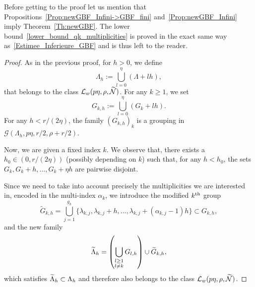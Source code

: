 \documentclass[AHL,Unicode,longabstracts]{cedram}
\newcommand{\n}{g}
\newcommand{\LL}{\mathcal{L}}
\newcommand{\NN}{\mathcal{N}}
\let\oldtilde\tilde
\renewcommand*{\tilde}[1]{\mathchoice{\widetilde{#1}}{\widetilde{#1}}{\oldtilde{#1}}{\oldtilde{#1}}}\let\oldexists\exists
\renewcommand*{\exists}{\mathrel{\oldexists}}
\begin{document}
Before getting to the proof let us mention that Propositions~\ref{Prop:newGBF_Infini->GBF_fini} and~\ref{Prop:newGBF_Infini} imply Theorem~\ref{Th:newGBF}. The lower bound~\eqref{lower_bound_qk_multiplicities} is proved in the exact same way as~\eqref{Estimee_Inferieure_GBF} and is thus left to the reader.
\begin{proof}
As in the previous proof, for $h>0$, we define
\[
\Lambda_h :=\bigcup_{l=0}^{\eta} (\Lambda + l h),
\]
that belongs to the class $\LL_w(p\eta,\rho,\tilde{\NN})$. For any $k \geq 1$, we set
\[
G_{k,h} := \bigcup_{l=0}^{\eta} (G_k + l h).
\]
For any $h<r/(2\eta)$, the family $(G_{k,h})_k$ is a grouping in $\mathcal{G}(\Lambda_h, p\eta,r/2,\rho+r/2)$.

Now, we are given a fixed index $k$. We observe that, there exists a $h_0\in(0,r/(2\eta))$ (possibly depending on $k$) such that, for any $h<h_0$, the sets $G_k, G_k+h, \dotsc, G_k+\eta h$ are pairwise disjoint.

Since we need to take into account precisely the multiplicities we are interested in, encoded in the multi-index $\alpha_k$, we introduce the modified $k^{\rm th}$ group
\goodbreak
\begingroup
\[
\widetilde{G}_{k,h} = \bigcup_{j=1}^{\n_k} \{\lambda_{k,j}, \lambda_{k,j} +h, \dotsc,\lambda_{k,j}+(\alpha_{k,j}-1) h \} \subset G_{k,h},
\]
and the new family
\[
\tilde{\Lambda}_h = \left(\bigcup_{\substack{l\geq 1\\l\neq k}} G_{l,h} \right) \cup \widetilde{G}_{k,h},
\]
\endgroup
which satisfies $\tilde{\Lambda}_h\subset \Lambda_h$ and therefore also belongs to the class $\LL_w(p\eta,\rho,\tilde{\NN})$.


\end{proof}
\end{document}
